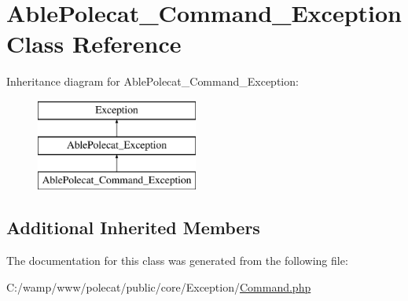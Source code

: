 \hypertarget{class_able_polecat___command___exception}{}\section{Able\+Polecat\+\_\+\+Command\+\_\+\+Exception Class Reference}
\label{class_able_polecat___command___exception}
Inheritance diagram for Able\+Polecat\+\_\+\+Command\+\_\+\+Exception\+:\begin{figure}[H]
\begin{center}
\leavevmode
\includegraphics[height=3.000000cm]{class_able_polecat___command___exception}
\end{center}
\end{figure}
\subsection*{Additional Inherited Members}


The documentation for this class was generated from the following file\+:\begin{DoxyCompactItemize}
\item 
C\+:/wamp/www/polecat/public/core/\+Exception/\hyperlink{_exception_2_command_8php}{Command.\+php}\end{DoxyCompactItemize}
